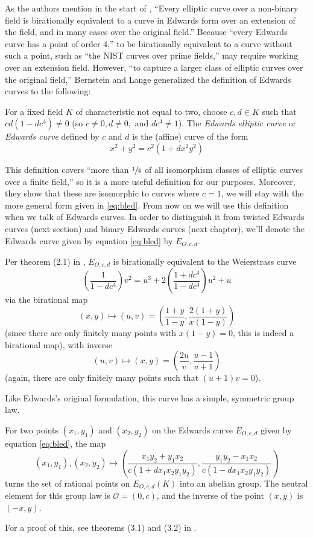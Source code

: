 As the authors mention in the start of \cite{bernstein2007faster}, ``Every
    elliptic curve over a non-binary field is birationally equivalent to a
    curve in Edwards form over an extension of the field, and in many cases
    over the original field.''
Because ``every Edwards curve has a point of order 4,'' to be birationally
    equivalent to a curve without such a point, such as ``the NIST curves over
    prime fields,'' may require working over an extension field.
However, ``to capture a larger class of elliptic curves over the original
    field,'' Bernstein and Lange generalized the definition of Edwards curves
    to the following:
\begin{dfn}
For a fixed field $K$ of characteristic not equal to two, choose $c, d \in K$
    such that $cd(1 - dc^4) \ne 0$ (so $c \ne 0, d \ne 0,$ and $dc^4 \ne 1$).
The \textit{Edwards elliptic curve} or \textit{Edwards curve} defined by $c$
    and $d$ is the (affine) curve of the form
\begin{equation}\label{eq:bled}
x^2 + y^2 = c^2(1 + dx^2y^2)
\end{equation}
\end{dfn}
This definition covers ``more than $\sfrac{1}{4}$ of all isomorphism classes of
    elliptic curves over a finite field,'' so it is a more useful definition
    for our purposes.
Moreover, they show that these are isomorphic to curves where $c = 1$, we will
    stay with the more general form given in \ref{eq:bled}.
From now on we will use this definition when we talk of Edwards curves.
In order to distinguish it from twisted Edwards curves (next section) and
    binary Edwards curves (next chapter), we'll denote the Edwards curve given
    by equation \ref{eq:bled} by $E_{O,c, d}$.

Per theorem (2.1) in \cite{bernstein2007faster}, $E_{O, c, d}$ is birationally
    equivalent to the Weierstrass curve
\[
\left(\frac{1}{1 - dc^4}\right)v^2
    =   u^3 + 2\left(\frac{1 + dc^4}{1 - dc^4}\right)u^2 + u
\]
    via the birational map
\[
(x, y)  \mapsto (u, v)
    =   \left(\frac{1 + y}{1 - y}, \frac{2(1 + y)}{x(1 - y)}\right)
\]
    (since there are only finitely many points with $x(1 - y) = 0$, this is
    indeed a birational map), with inverse
\[
(u, v)  \mapsto (x, y)
    =   \left(\frac{2u}{v}, \frac{u - 1}{u + 1}\right)
\]
    (again, there are only finitely many points such that $(u + 1)v = 0$).

Like Edwards's original formulation, this curve has a simple, symmetric group
    law.
\begin{thm}
For two points $(x_1, y_1)$ and $(x_2, y_2)$ on the Edwards curve $E_{O, c, d}$
    given by equation \ref{eq:bled}, the map
\[
(x_1, y_1), (x_2, y_2) \mapsto
\left(
    \frac{x_1y_2 + y_1x_2}{c(1 + dx_1x_2y_1y_2)}
    ,
    \frac{y_1y_2 - x_1x_2}{c(1 - dx_1x_2y_1y_2)}
\right)
\]
    turns the set of rational points on $E_{O, c, d}(K)$ into an abelian group.
The neutral element for this group law is $\mathcal{O} = (0, c)$, and the
    inverse of the point $(x, y)$ is $(-x, y)$.
\end{thm}
For a proof of this, see theorems (3.1) and (3.2) in
    \cite{bernstein2007faster}.

